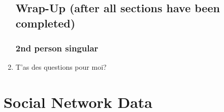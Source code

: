 \begin{enumerate}
\subsection{Wrap-Up (after all sections have been completed)}
  \subsubsection{2nd person singular}
    \item T'as des questions pour moi?\\
  \end{enumerate}

\newpage
\section{Social Network Data}
